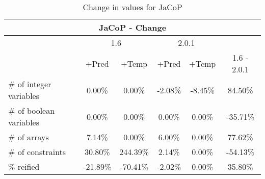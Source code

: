 \documentclass{standalone}
\begin{document}
\begin{table}[H]
\footnotesize
\centering
\begin{tabular}{lc|c|c|c|c}
\multicolumn{6}{c}{JaCoP - Change} \\ 
\hline\hline  & \multicolumn{2}{c|}{1.6} &\multicolumn{2}{c|}{2.0.1} &\\ 
\hline  & +Pred & +Temp & +Pred & +Temp & 1.6 - 2.0.1\\
\# of integer variables & 0.00\% & 0.00\% & -2.08\% & -8.45\% & 84.50\% \\ 
\# of boolean variables & 0.00\% & 0.00\% & 0.00\% & 0.00\% & -35.71\% \\
\# of arrays            & 7.14\% & 0.00\% & 6.00\% & 0.00\% & 77.62\% \\
\# of constraints       & 30.80\% & 244.39\% & 2.14\% & 0.00\% & -54.13\% \\ 
\% reified               & -21.89\% & -70.41\% & -2.02\% & 0.00\% & 35.80\%\\ 
\end{tabular}\caption{Change in values for JaCoP}
\end{table}
\end{document}
